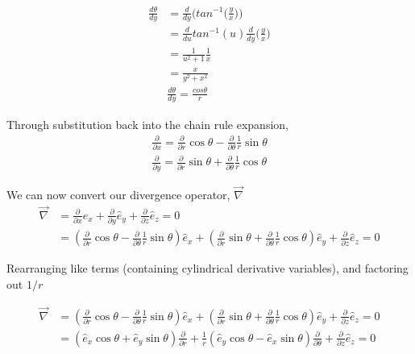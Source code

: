 \documentclass[12pt]{article}
\begin{document}
\begin{align*}
	\frac{d \theta}{d y} 
	&= \frac{d}{dy} \Bigg(tan^{-1} \Big(\frac{y}{x}\Big)\Bigg)  \\
	&= \frac{d}{du}tan^{-1}(u) \frac{d}{dy} \Big( \frac{y}{x} \Big)\\
	&= \frac{1}{u^2  + 1} \frac{1}{x} \\
	&= \frac{x}{y^2 + x^2} \\
	& \boxed{\frac{d \theta}{d y}  = \frac{cos \theta}{r}}
\end{align*}

Through substitution back into the chain rule expansion,
\begin{align*}
	\frac{\partial} {\partial x} =
	\frac{\partial} {\partial r} \cos \theta %
	- \frac{\partial} {\partial \theta} \frac{1}{r} \sin \theta \\
	\frac{\partial} {\partial y} =
	\frac{\partial} {\partial r} \sin \theta %
	+ \frac{\partial} {\partial \theta} \frac{1}{r} \cos \theta
\end{align*}
	\[\]
	\[\]

We can now convert our divergence operator, $\vec{\nabla}$ 
\begin{align*}
	\vec{\nabla} &=
	\frac{\partial }{\partial x} \hat{e}_x +
	\frac{\partial }{\partial y} \hat{e}_y +
	\frac{\partial }{\partial z} \hat{e}_z = 0 \\
	&=
	\left(
	\frac{\partial}{\partial r} \cos \theta -
	\frac{\partial}{\partial \theta} \frac{1}{r} \sin \theta \right)\hat{e}_x +
	\left(
	\frac{\partial} {\partial r} \sin \theta +
	\frac{\partial} {\partial \theta} \frac{1}{r} \cos \theta \right)\hat{e}_y +
	\frac{\partial }{\partial z} \hat{e}_z                        = 0
\end{align*}

Rearranging like terms (containing cylindrical derivative variables), and factoring out $1/r$

\begin{align*}
	\vec{\nabla} &=
	\left(
	\frac{\partial} {\partial r} \cos \theta -
	\frac{\partial} {\partial \theta} \frac{1}{r} \sin \theta
	\right)\hat{e}_x +
	\left(
	\frac{\partial} {\partial r} \sin \theta +
	\frac{\partial} {\partial \theta} \frac{1}{r}\cos  \theta
	\right) \hat{e}_y +
	\frac{\partial }{\partial z} \hat{e}_z = 0 \\
	&= \left(
	\hat{e}_x \cos \theta +
	\hat{e}_y \sin \theta
	\right)
	\frac{\partial} {\partial r} +
	\frac{1}{r}\left(
	\hat{e}_y  \cos \theta -
	\hat{e}_x \sin \theta
	\right)
	\frac{\partial} {\partial \theta} +
	\frac{\partial }{\partial z} \hat{e}_z = 0
\end{align*}
\end{document}
